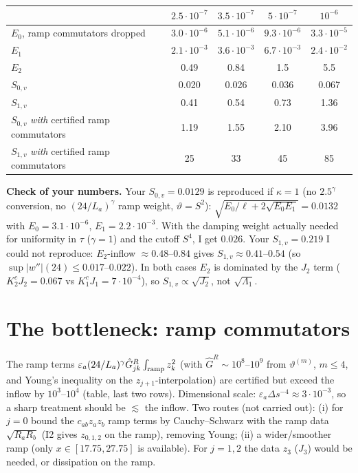 \documentclass[11pt]{article}
\begin{document}
\begin{center}\begin{tabular}{l|cccc}
 & $2.5\!\cdot\!10^{-7}$ & $3.5\!\cdot\!10^{-7}$ & $5\!\cdot\!10^{-7}$ & $10^{-6}$\\\hline
$E_0$, ramp commutators dropped & $3.0\!\cdot\!10^{-6}$ & $5.1\!\cdot\!10^{-6}$ & $9.3\!\cdot\!10^{-6}$ & $3.3\!\cdot\!10^{-5}$\\
$E_1$ & $2.1\!\cdot\!10^{-3}$ & $3.6\!\cdot\!10^{-3}$ & $6.7\!\cdot\!10^{-3}$ & $2.4\!\cdot\!10^{-2}$\\
$E_2$ & 0.49 & 0.84 & 1.5 & 5.5\\
$S_{0,v}$ & 0.020 & 0.026 & 0.036 & 0.067\\
$S_{1,v}$ & 0.41 & 0.54 & 0.73 & 1.36\\\hline
$S_{0,v}$ \emph{with} certified ramp commutators & 1.19 & 1.55 & 2.10 & 3.96\\
$S_{1,v}$ \emph{with} certified ramp commutators & 25 & 33 & 45 & 85
\end{tabular}\end{center}
\textbf{Check of your numbers.} Your $S_{0,v}=0.0129$ is reproduced if $\kappa=1$ (no $2.5^\gamma$ conversion, no $(24/L_a)^\gamma$ ramp weight, $\vartheta=S^2$): $\sqrt{E_0/\ell+2\sqrt{E_0E_1}}=0.0132$ with $E_0=3.1\cdot10^{-6}$, $E_1=2.2\cdot10^{-3}$. With the damping weight actually needed for uniformity in $\tau$ ($\gamma=1$) and the cutoff $S^4$, I get $0.026$. Your $S_{1,v}=0.219$ I could not reproduce: $E_2$-inflow $\approx0.48$--$0.84$ gives $S_{1,v}\approx0.41$--$0.54$ (so $\sup|w''|(24)\le0.017$--$0.022$). In both cases $E_2$ is dominated by the $J_2$ term ($K^c_2J_2=0.067$ vs $K^c_1J_1=7\cdot10^{-4}$), so $S_{1,v}\propto\sqrt{J_2}$, not $\sqrt{\Lambda_1}$.

\section{The bottleneck: ramp commutators}
The ramp terms $\varepsilon_a(24/L_a)^\gamma\hat G^R_{jk}\int_{\rm ramp}z_k^2$ (with $\hat G^R\sim10^{8}$--$10^9$ from $\vartheta^{(m)}$, $m\le4$, and Young's inequality on the $z_{j+1}$-interpolation) are certified but exceed the inflow by $10^3$--$10^4$ (table, last two rows). Dimensional scale: $\varepsilon_a\Delta s^{-4}\approx3\cdot10^{-3}$, so a sharp treatment should be $\lesssim$ the inflow. Two routes (not carried out): (i) for $j=0$ bound the $c_{ab}z_az_b$ ramp terms by Cauchy--Schwarz with the ramp data $\sqrt{R_aR_b}$ (I2 gives $z_{0,1,2}$ on the ramp), removing Young; (ii) a wider/smoother ramp (only $x\in[17.75,27.75]$ is available). For $j=1,2$ the data $z_3$ ($J_3$) would be needed, or dissipation on the ramp.
\end{document}
